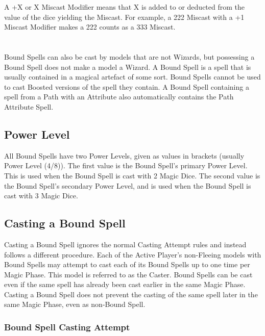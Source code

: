 A +X or \minuss{}X Miscast Modifier means that X is added to or deducted from the value of the dice yielding the Miscast. For example, a 222 Miscast with a +1 Miscast Modifier makes a 222 counts as a 333 Miscast.

\section{\boundspells{}}
\label{bound_spells}

Bound Spells can also be cast by models that are not Wizards, but possessing a Bound Spell does not make a model a Wizard. A Bound Spell is a spell that is usually contained in a magical artefact of some sort. Bound Spells cannot be used to cast Boosted versions of the spell they contain. A Bound Spell containing a spell from a Path with an Attribute also automatically contains the Path Attribute Spell.

\subsection{Power Level}

All Bound Spells have two Power Levels, given as values in brackets (usually Power Level (4/8)). The first value is the Bound Spell's primary Power Level. This is used when the Bound Spell is cast with 2 Magic Dice. The second value is the Bound Spell's secondary Power Level, and is used when the Bound Spell is cast with 3 Magic Dice.

\subsection{Casting a Bound Spell}

Casting a Bound Spell ignores the normal Casting Attempt rules and instead follows a different procedure. Each of the Active Player's non-Fleeing models with Bound Spells may attempt to cast each of its Bound Spells up to one time per Magic Phase. This model is referred to as the Caster. Bound Spells can be cast even if the same spell has already been cast earlier in the same Magic Phase. Casting a Bound Spell does not prevent the casting of the same spell later in the same Magic Phase, even as non-Bound Spell.

\subsubsection{Bound Spell Casting Attempt}

